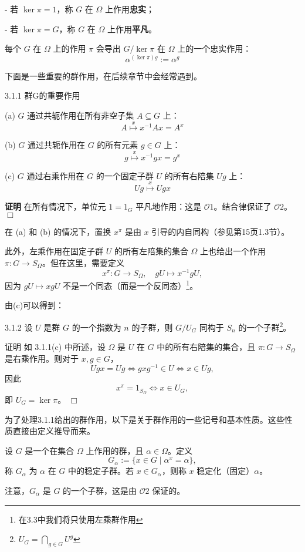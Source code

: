 \documentclass[UTF8]{ctexart}
\begin{document}
- 若 $\ker \pi = 1$，称 $G$ 在 $\Omega$ 上作用\textbf{忠实}；

- 若 $\ker \pi = G$，称 $G$ 在 $\Omega$ 上作用\textbf{平凡}。

每个 $G$ 在 $\Omega$ 上的作用 $\pi$ 会导出 $G / \ker \pi$ 在 $\Omega$ 上的一个忠实作用：
$$
    \alpha^{(\ker \pi) g} := \alpha^g
$$

下面是一些重要的群作用，在后续章节中会经常遇到。


3.1.1 群G的重要作用


(a) $G$ 通过共轭作用在所有非空子集 $A \subseteq G$ 上：
$$
    A \overset{x}{\mapsto} x^{-1} A x = A^x
$$

(b) $G$ 通过共轭作用在 $G$ 的所有元素 $g \in G$ 上：
$$
    g \overset{x}{\mapsto} x^{-1} g x = g^x
$$

(c) $G$ 通过右乘作用在 $G$ 的一个固定子群 $U$ 的所有右陪集 $Ug$ 上：
$$
    Ug \overset{x}{\mapsto} Ugx
$$



\textbf{证明}
在所有情况下，单位元 $1 = 1_G$ 平凡地作用：这是 $\mathcal{O}1$。结合律保证了 $\mathcal{O}2$。 $\Box$

在 (a) 和 (b) 的情况下，置换 $x^\pi$ 是由 $x$ 引导的内自同构（参见第15页1.3节）。

此外，左乘作用在固定子群 $U$ 的所有左陪集的集合 $\Omega$ 上也给出一个作用 $\pi: G \to S_\Omega$。但在这里，需要定义
$$
    x^\pi : G \to S_\Omega, \quad gU \mapsto x^{-1} gU,
$$
因为 $gU \mapsto xgU$ 不是一个同态（而是一个反同态）\footnote[2]{在3.3中我们将只使用左乘群作用}。


由(c)可以得到：


3.1.2
设 $U$ 是群 $G$ 的一个指数为 $n$ 的子群，则 $G / U_G$ 同构于 $S_n$ 的一个子群\footnote[3]{$U_G=\bigcap_{g\in G} U^g$}。

证明
如 3.1.1(c) 中所述，设 $\Omega$ 是 $U$ 在 $G$ 中的所有右陪集的集合，且 $\pi: G \to S_\Omega$ 是右乘作用。则对于 $x, g \in G$，
$$
    Ugx = Ug \iff gxg^{-1} \in U \iff x \in Ug,
$$
因此
$$
    x^\pi = 1_{S_\Omega} \iff x \in U_G,
$$
即 $U_G = \ker \pi$。 $\Box$



为了处理3.1.1给出的群作用，以下是关于群作用的一些记号和基本性质。这些性质直接由定义推导而来。

设 $G$ 是一个在集合 $\Omega$ 上作用的群，且 $\alpha \in \Omega$。定义
$$
    G_\alpha := \{x \in G \mid \alpha^x = \alpha\},
$$
称 $G_\alpha$ 为 $\alpha$ 在 $G$ 中的稳定子群。若 $x \in G_\alpha$，则称 $x$ 稳定化（固定）$\alpha$。

注意，$G_\alpha$ 是 $G$ 的一个子群，这是由 $\mathcal{O}2$ 保证的。
\end{document}
